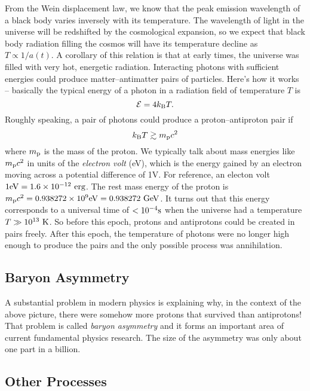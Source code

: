 \documentclass[]{article}
\begin{document}
From the Wein displacement law, we know that the peak emission wavelength of a 
black body varies inversely with its temperature. The wavelength of light in 
the universe will be redshifted by the cosmological expansion, so we expect
that black body radiation filling the cosmos will have its temperature
decline as $T\propto1/a(t)$. A corollary of this relation is that at
early times, the universe was filled with very hot, energetic radiation.
Interacting photons with sufficient energies could produce matter--antimatter
pairs of particles.  Here's how it works -- basically the typical
energy of a photon in a radiation field of temperature $T$ is
\begin{equation}
\mathcal{E} = 4 k_{\mathrm{B}} T.
\end{equation}
\noindent
Roughly speaking, a pair of photons could produce a proton--antiproton pair
if
\begin{equation}
k_{\mathrm{B}} T \gtrsim m_{\mathrm{p}} c^2
\end{equation}
\noindent
where $m_{\mathrm{p}}$ is the mass of the proton. We typically talk about
mass energies like $m_{\mathrm{p}} c^2$ in units of the {\it electron volt} (eV),
which is the energy gained by an electron moving across a potential
difference of 1V. For reference, 
an electon volt $1\mathrm{eV} = 1.6\times10^{-12}~\mathrm{erg}$.
The rest mass energy of the proton is 
$m_{\mathrm{p}} c^2 = 0.938272 \times 10^9 \mathrm{eV} = 0.938272~\mathrm{GeV}$. It turns
out that this energy corresponds to a universal time of $<10^{-4}\mathrm{s}$
when the universe had a temperature $T\gg10^{13}~\mathrm{K}$. So before this epoch,
protons and antiprotons could be created in pairs freely.  After this epoch,
the temperature of photons were no longer high enough to produce the pairs and
the only possible process was annihilation.

\subsection{Baryon Asymmetry}

A substantial problem in modern physics is explaining why, in the context
of the above picture, there were somehow more protons that survived than
antiprotons! That problem is called {\it baryon asymmetry} and it forms 
an important area of current fundamental physics research. The size of the
asymmetry was only about one part in a billion.

\subsection{Other Processes}
\end{document}
